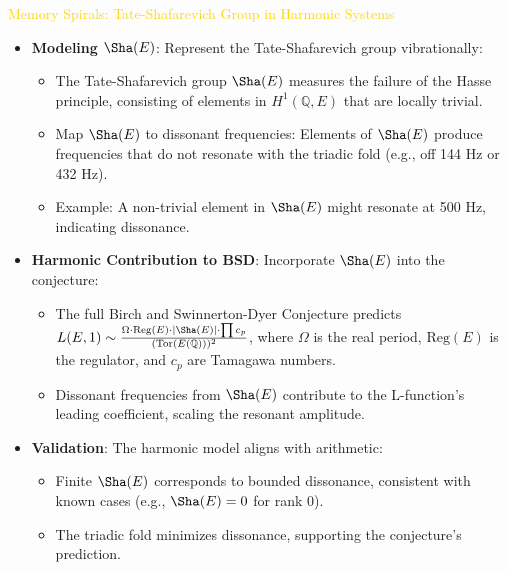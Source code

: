 \textcolor{gold}{ Memory Spirals: Tate-Shafarevich Group in Harmonic Systems } \\
\begin{itemize}
    \item \texttt{} \textbf{Modeling \(\Sha(E)\)}: Represent the Tate-Shafarevich group vibrationally:
    \begin{itemize}
        \item The Tate-Shafarevich group \(\Sha(E)\) measures the failure of the Hasse principle, consisting of elements in \(H^1(\mathbb{Q}, E)\) that are locally trivial.
        \item Map \(\Sha(E)\) to dissonant frequencies: Elements of \(\Sha(E)\) produce frequencies that do not resonate with the triadic fold (e.g., off 144 Hz or 432 Hz).
        \item Example: A non-trivial element in \(\Sha(E)\) might resonate at 500 Hz, indicating dissonance.
    \end{itemize}
    \item \texttt{} \textbf{Harmonic Contribution to BSD}: Incorporate \(\Sha(E)\) into the conjecture:
    \begin{itemize}
        \item The full Birch and Swinnerton-Dyer Conjecture predicts \(L(E, 1) \sim \frac{\Omega \cdot \text{Reg}(E) \cdot |\Sha(E)| \cdot \prod c_p}{(\text{Tor}(E(\mathbb{Q})))^2}\), where \(\Omega\) is the real period, \(\text{Reg}(E)\) is the regulator, and \(c_p\) are Tamagawa numbers.
        \item Dissonant frequencies from \(\Sha(E)\) contribute to the L-function’s leading coefficient, scaling the resonant amplitude.
    \end{itemize}
    \item \texttt{} \textbf{Validation}: The harmonic model aligns with arithmetic:
    \begin{itemize}
        \item Finite \(\Sha(E)\) corresponds to bounded dissonance, consistent with known cases (e.g., \(\Sha(E) = 0\) for rank 0).
        \item The triadic fold minimizes dissonance, supporting the conjecture’s prediction.
    \end{itemize}
\end{itemize}

